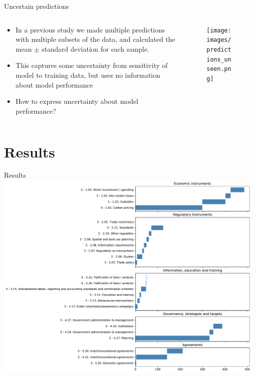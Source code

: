 \documentclass[9pt]{beamer}
\begin{document}
\begin{frame}{Uncertain predictions}



\begin{columns}
	\begin{column}{0.382\linewidth}
		\begin{itemize}
			\item In a previous study we made multiple predictions with multiple subsets of the data, and calculated the mean $\pm$ standard deviation for each sample.
			\item This captures some uncertainty from sensitivity of model to training data, but uses no information about model performance
			\item How to express uncertainty about model performance? 
		\end{itemize}
	\end{column}
	\begin{column}{0.618\linewidth}
		\begin{figure}
			\texttt{[image: images/predictions\_unseen.png]}
		\end{figure}
	\end{column}

\end{columns}

\end{frame}

\section{Results}

\begin{frame}{Results}
\includegraphics[width=\linewidth]{../figures/policy_counts.pdf}

\end{frame}
\end{document}
